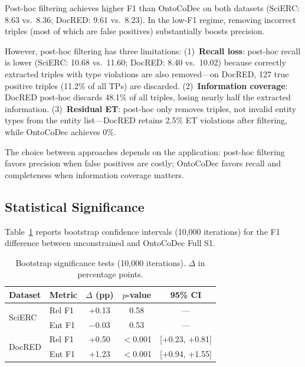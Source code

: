 \documentclass[11pt,a4paper]{article}
\newcommand{\method}{OntoCoDec}
\begin{document}
Post-hoc filtering achieves higher F1 than \method{} on both datasets (SciERC: 8.63 vs.\ 8.36; DocRED: 9.61 vs.\ 8.23). In the low-F1 regime, removing incorrect triples (most of which are false positives) substantially boosts precision.

However, post-hoc filtering has three limitations: (1)~\textbf{Recall loss}: post-hoc recall is lower (SciERC: 10.68 vs.\ 11.60; DocRED: 8.40 vs.\ 10.02) because correctly extracted triples with type violations are also removed---on DocRED, 127 true positive triples (11.2\% of all TPs) are discarded. (2)~\textbf{Information coverage}: DocRED post-hoc discards 48.1\% of all triples, losing nearly half the extracted information. (3)~\textbf{Residual ET}: post-hoc only removes triples, not invalid entity types from the entity list---DocRED retains 2.5\% ET violations after filtering, while \method{} achieves 0\%.

The choice between approaches depends on the application: post-hoc filtering favors precision when false positives are costly; \method{} favors recall and completeness when information coverage matters.

\subsection{Statistical Significance}
\label{sec:significance}

Table~\ref{tab:bootstrap} reports bootstrap confidence intervals (10,000 iterations) for the F1 difference between unconstrained and \method{} Full S1.

\begin{table}[t]
\centering
\small
\caption{Bootstrap significance tests (10,000 iterations). $\Delta$ in percentage points.}
\label{tab:bootstrap}
\begin{tabular}{llccc}
\toprule
\textbf{Dataset} & \textbf{Metric} & \textbf{$\Delta$ (pp)} & \textbf{$p$-value} & \textbf{95\% CI} \\
\midrule
\multirow{2}{*}{SciERC}
    & Rel F1 & +0.13 & 0.58 & --- \\
    & Ent F1 & $-$0.03 & 0.53 & --- \\
\midrule
\multirow{2}{*}{DocRED}
    & Rel F1 & +0.50 & $<$0.001 & [+0.23, +0.81] \\
    & Ent F1 & +1.23 & $<$0.001 & [+0.94, +1.55] \\
\bottomrule
\end{tabular}
\end{table}
\end{document}
